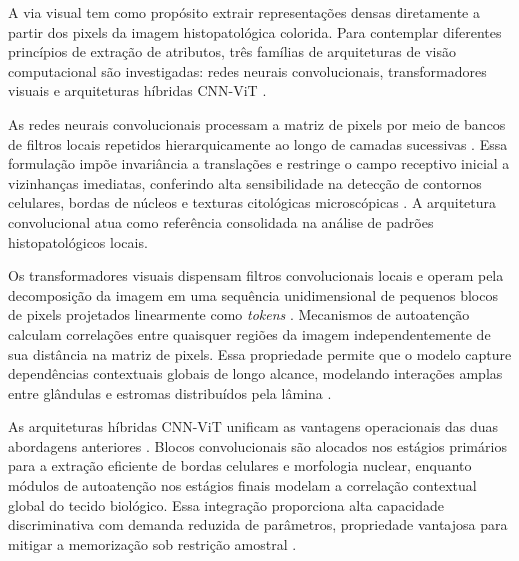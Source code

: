 A via visual tem como propósito extrair representações densas diretamente a partir dos pixels da imagem histopatológica colorida. Para contemplar diferentes princípios de extração de atributos, três famílias de arquiteturas de visão computacional são investigadas: redes neurais convolucionais, transformadores visuais e arquiteturas híbridas CNN-ViT \cite{clinicalReview,oliveira2025hybrid}.

As redes neurais convolucionais processam a matriz de pixels por meio de bancos de filtros locais repetidos hierarquicamente ao longo de camadas sucessivas \cite{litjens2017survey}. Essa formulação impõe invariância a translações e restringe o campo receptivo inicial a vizinhanças imediatas, conferindo alta sensibilidade na detecção de contornos celulares, bordas de núcleos e texturas citológicas microscópicas \cite{he2016deep,tan2019efficientnet}. A arquitetura convolucional atua como referência consolidada na análise de padrões histopatológicos locais.

Os transformadores visuais dispensam filtros convolucionais locais e operam pela decomposição da imagem em uma sequência unidimensional de pequenos blocos de pixels projetados linearmente como \textit{tokens} \cite{dosovitskiy2020image,shamshad2023transformers}. Mecanismos de autoatenção calculam correlações entre quaisquer regiões da imagem independentemente de sua distância na matriz de pixels. Essa propriedade permite que o modelo capture dependências contextuais globais de longo alcance, modelando interações amplas entre glândulas e estromas distribuídos pela lâmina \cite{touvron2021training}.

As arquiteturas híbridas CNN-ViT unificam as vantagens operacionais das duas abordagens anteriores \cite{dai2021coatnet,oliveira2025hybrid}. Blocos convolucionais são alocados nos estágios primários para a extração eficiente de bordas celulares e morfologia nuclear, enquanto módulos de autoatenção nos estágios finais modelam a correlação contextual global do tecido biológico. Essa integração proporciona alta capacidade discriminativa com demanda reduzida de parâmetros, propriedade vantajosa para mitigar a memorização sob restrição amostral \cite{mehta2022mobilevit,ma2026cihm}.

